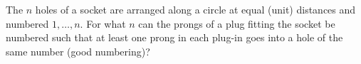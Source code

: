 The $n$ holes of a socket are arranged along a circle at equal (unit) distances and numbered $1, \ldots, n$. For what $n$ can the prongs of a plug fitting the socket be numbered such that at least one prong in each plug-in goes into a hole of the same number (good numbering)?
